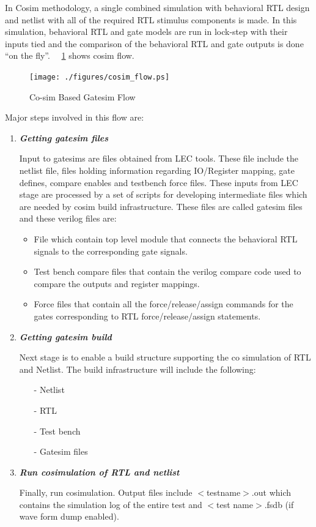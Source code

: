  In Cosim methodology, a single combined simulation with behavioral RTL design and netlist with all of the required RTL stimulus components is made. In this simulation, behavioral RTL and gate models are run in lock-step with their inputs tied and the comparison of the behavioral RTL and gate outputs is done ``on the fly''. ~\figurename{~\ref{fig:cosim_flow.ps}} shows cosim flow.




\begin{figure}[H]
\centering
\texttt{[image: ./figures/cosim\_flow.ps]}
\caption{Co-sim Based Gatesim Flow}
\label{fig:cosim_flow.ps}
\end{figure}

Major steps involved in this flow are:

\begin{enumerate}
	\item \emph{\bf Getting gatesim files}

	Input to gatesims are files obtained from LEC tools. These file include the netlist file, files holding information regarding IO/Register mapping, gate defines, compare enables and testbench force files. These inputs from LEC stage are processed by a set of scripts for developing intermediate files which are needed by cosim build infrastructure. These files are called gatesim files and these verilog files are:
	\begin{itemize}
		\item File which contain top level module that connects the behavioral RTL signals to the corresponding gate signals.
		\item Test bench compare files that contain the verilog compare code used to compare the outputs and register mappings.
		\item Force files that contain all the force/release/assign commands for the gates corresponding to RTL force/release/assign statements.
	\end{itemize}

	\item \emph{\bf Getting gatesim build} 

	Next stage is to enable a build structure supporting the co simulation of RTL and Netlist. The build infrastructure will include the following:
	\begin{itemize}
		\item[-]Netlist
		\item[-]RTL
		\item[-]Test bench
		\item[-]Gatesim files
	\end{itemize}

	\item \emph{\bf Run cosimulation of RTL and netlist}

	Finally, run cosimulation. Output files include $<$testname$>$.out which contains the simulation log of the entire test and $<$test name$>$.fsdb (if wave form dump enabled).
\end{enumerate}



